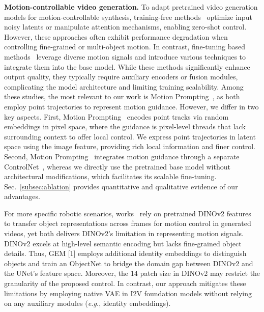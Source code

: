 \documentclass{article}
\newcommand{\eg}{\textit{e.g.}}
\begin{document}
\noindent \textbf{Motion-controllable video generation.}
To adapt pretrained video generation models for motion-controllable synthesis, training-free methods~\cite{namekata2024sg,qiu2024freetraj,ma2024trailblazer,jain2024peekaboo} optimize input noisy latents or manipulate attention mechanisms, enabling zero-shot control.
However, these approaches often exhibit performance degradation when controlling fine-grained or multi-object motion. 
In contrast, fine-tuning based methods~\cite{wang2023videocomposer,yin2023dragnuwa,wang2024motionctrl,wu2024draganything,burgert2025gowiththeflow,zhang2024tora,li2025magicmotion,li2025image,wang2024levitor,xiao20243dtrajmaster,wang2025cinemaster,gu2025diffusion,zhou2025trackgo,shi2024motioni2v,chen2025perception,wang2024replace,xia2025dreamve} leverage diverse motion signals and introduce various techniques to integrate them into the base model. 
While these methods significantly enhance output quality, they typically require auxiliary encoders or fusion modules, complicating the model architecture and limiting training scalability.
Among these studies, the most relevant to our work is Motion Prompting~\cite{geng2024motion}, as both employ point trajectories to represent motion guidance. However, we differ in two key aspects.
First, Motion Prompting~\cite{geng2024motion} encodes point tracks via random embeddings in pixel space, where the guidance is pixel-level threads that lack surrounding context to offer local control. We express point trajectories in latent space using the image feature, providing rich local information and finer control.
Second, Motion Prompting~\cite{geng2024motion} integrates motion guidance through a separate ControlNet~\cite{controlnet}, whereas we directly use the pretrained base model without architectural modifications, which facilitates its scalable fine-tuning.
Sec.~\ref{subsec:ablation} provides quantitative and qualitative evidence of our advantages.

For more specific robotic scenarios, 
works~\cite{hassan2025gem,davtyan2025cage} rely on pretrained DINOv2 features~\cite{oquab2023dinov2} to transfer object representations across frames for motion control in generated videos, yet both delivers DINOv2’s limitation in representing motion signals.
DINOv2 excels at high-level semantic encoding but lacks fine-grained object details. Thus, GEM [1] employs additional identity embeddings to distinguish objects and train an ObjectNet to bridge the domain gap between DINOv2 and the UNet’s feature space. Moreover, the 14 patch size in DINOv2 may restrict the granularity of the proposed control. In contrast, our approach mitigates these limitations by employing native VAE in I2V foundation models without relying on any auxiliary modules (\eg, identity embeddings).
\end{document}
